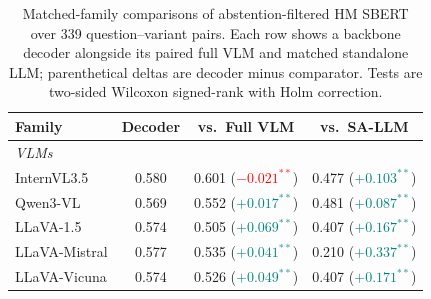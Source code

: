 \begin{table}[ht]
\centering
\small
\setlength{\tabcolsep}{4pt}

\caption{Matched-family comparisons of abstention-filtered HM SBERT over 339 question--variant pairs. Each row shows a backbone decoder alongside its paired full VLM and matched standalone LLM; parenthetical deltas are decoder minus comparator. Tests are two-sided Wilcoxon signed-rank with Holm correction.}
\label{tab:matched_family_alignment_tests}
\begin{tabular}{lccc}
\toprule
\textbf{Family} & \textbf{Decoder} & \textbf{vs.\ Full VLM} & \textbf{vs.\ SA-LLM} \\
\midrule
\multicolumn{4}{l}{\textit{VLMs}} \\
InternVL3.5 & 0.580 & 0.601 {\scriptsize (\textcolor{red}{$-0.021^{**}$})} & 0.477 {\scriptsize (\textcolor{teal}{$+0.103^{**}$})} \\
Qwen3-VL & 0.569 & 0.552 {\scriptsize (\textcolor{teal}{$+0.017^{**}$})} & 0.481 {\scriptsize (\textcolor{teal}{$+0.087^{**}$})} \\
LLaVA-1.5 & 0.574 & 0.505 {\scriptsize (\textcolor{teal}{$+0.069^{**}$})} & 0.407 {\scriptsize (\textcolor{teal}{$+0.167^{**}$})} \\
LLaVA-Mistral & 0.577 & 0.535 {\scriptsize (\textcolor{teal}{$+0.041^{**}$})} & 0.210 {\scriptsize (\textcolor{teal}{$+0.337^{**}$})} \\
LLaVA-Vicuna & 0.574 & 0.526 {\scriptsize (\textcolor{teal}{$+0.049^{**}$})} & 0.407 {\scriptsize (\textcolor{teal}{$+0.171^{**}$})} \\
\bottomrule
\end{tabular}
\end{table}
